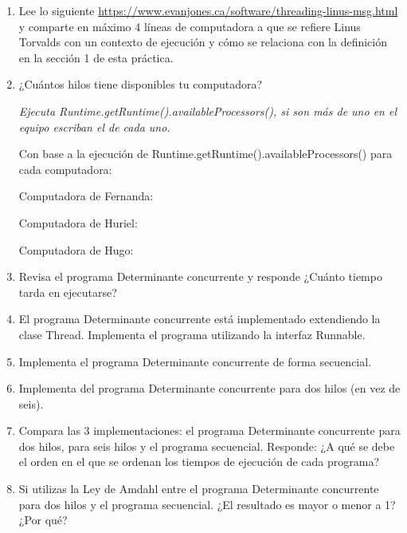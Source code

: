 \begin{enumerate}
    \item Lee lo siguiente \href{https://www.evanjones.ca/software/threading-linus-msg.html}{https://www.evanjones.ca/software/threading-linus-msg.html} y comparte en máximo 4 líneas de computadora a que se refiere Linus Torvalds con un contexto de ejecución y cómo se relaciona con la definición en la sección 1 de esta práctica.

    \hfill
    
    \item  ¿Cuántos hilos tiene disponibles tu computadora?
    
    \textit{Ejecuta Runtime.getRuntime().availableProcessors(), si son más de uno en el equipo escriban el de cada uno.}

    Con base a la ejecución de Runtime.getRuntime().availableProcessors() para cada computadora:

    Computadora de Fernanda:

    Computadora de Huriel:

    Computadora de Hugo:

    \hfill
    
    \item Revisa el programa Determinante concurrente y responde ¿Cuánto tiempo tarda en ejecutarse?

    \hfill    

    \item El programa Determinante concurrente está implementado extendiendo la clase Thread. Implementa el programa utilizando la interfaz Runnable.

    \hfill
    
    \item Implementa el programa Determinante concurrente de forma secuencial.

    \hfill
    
    \item Implementa del programa Determinante concurrente para dos hilos (en vez de seis).

    \hfill

    \item Compara las 3 implementaciones: el programa Determinante concurrente para dos hilos, para seis hilos y el programa secuencial. Responde: ¿A qué se debe el orden en el que se ordenan los tiempos de ejecución de cada programa?

    \hfill    
    
    \item Si utilizas la Ley de Amdahl entre el programa Determinante concurrente para dos hilos y el programa secuencial. ¿El resultado es mayor o menor a 1? ¿Por qué?


\end{enumerate}
